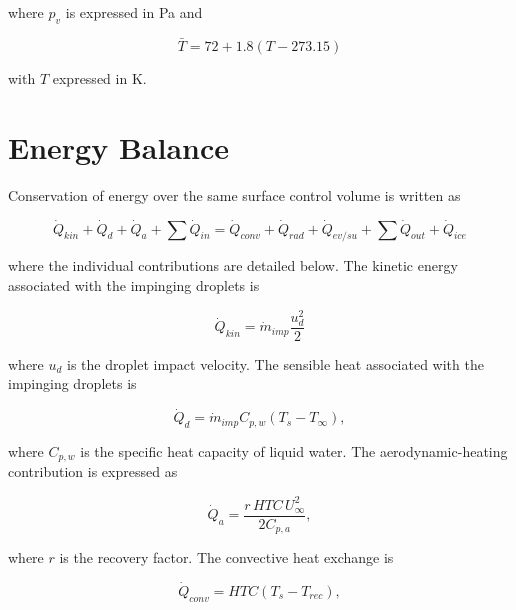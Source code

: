 where $p_v$ is expressed in Pa and

\begin{equation}
    \bar{T}
    =
    72 + 1.8\left(T-273.15\right)
    \label{eq:app_vapor_temperature}
\end{equation}

with $T$ expressed in K.

\section{Energy Balance}

Conservation of energy over the same surface control volume is written as

\begin{equation}
    \dot{Q}_{kin}
    + \dot{Q}_{d}
    + \dot{Q}_{a}
    + \sum \dot{Q}_{in}
    =
    \dot{Q}_{conv}
    + \dot{Q}_{rad}
    + \dot{Q}_{ev/su}
    + \sum \dot{Q}_{out}
    + \dot{Q}_{ice}
    \label{eq:app_energy_balance}
\end{equation}

where the individual contributions are detailed below. The kinetic energy associated with the impinging droplets is

\begin{equation}
    \dot{Q}_{kin}
    =
    \dot{m}_{imp}\frac{u_d^2}{2}
    \label{eq:app_qkin}
\end{equation}

where $u_d$ is the droplet impact velocity. The sensible heat associated with the impinging droplets is

\begin{equation}
    \dot{Q}_{d}
    =
    \dot{m}_{imp} C_{p,w}
    \left(T_s-T_\infty\right),
    \label{eq:app_qdroplet}
\end{equation}

where $C_{p,w}$ is the specific heat capacity of liquid water. The aerodynamic-heating contribution is expressed as

\begin{equation}
    \dot{Q}_{a}
    =
    \frac{r\,HTC\,U_\infty^2}
         {2C_{p,a}},
    \label{eq:app_qaero}
\end{equation}

where $r$ is the recovery factor. The convective heat exchange is

\begin{equation}
    \dot{Q}_{conv}
    =
    HTC\left(T_s-T_{rec}\right),
    \label{eq:app_qconv_recovery}
\end{equation}

